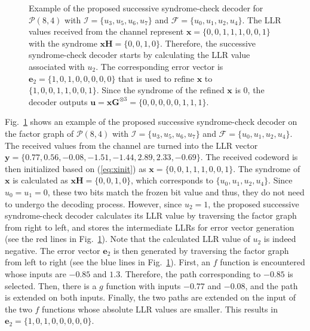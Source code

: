 \documentclass[conference]{IEEEtran}
\begin{document}
\begin{figure}
    \centering
    
    \caption{Example of the proposed successive syndrome-check decoder for $\mathcal{P}(8,4)$ with $\mathcal{I} = \{u_3,u_5,u_6,u_7\}$ and $\mathcal{F} = \{u_0,u_1,u_2,u_4\}$. The LLR values received from the channel represent $\bm{x} = \{0,0,1,1,1,0,0,1\}$ with the syndrome $\bm{x}\bm{H} = \{0,0,1,0\}$. Therefore, the successive syndrome-check decoder starts by calculating the LLR value associated with $u_2$. The corresponding error vector is $\bm{e}_2 = \{1,0,1,0,0,0,0,0\}$ that is used to refine $\bm{x}$ to $\{1,0,0,1,1,0,0,1\}$. Since the syndrome of the refined $\bm{x}$ is $0$, the decoder outputs $\bm{u} = \bm{x}\bm{G}^{\otimes 3} = \{0,0,0,0,0,1,1,1\}$.}
    \label{fig:SSCdecEx}
\end{figure}

Fig.~\ref{fig:SSCdecEx} shows an example of the proposed successive syndrome-check decoder on the factor graph of $\mathcal{P}(8,4)$ with $\mathcal{I} = \{u_3,u_5,u_6,u_7\}$ and $\mathcal{F} = \{u_0,u_1,u_2,u_4\}$. The received values from the channel are turned into the LLR vector $\bm{y} = \{0.77,0.56,-0.08,-1.51,-1.44,2.89,2.33,-0.69\}$. The received codeword is then initialized based on (\ref{eq:xinit}) as $\bm{x} = \{0,0,1,1,1,0,0,1\}$. The syndrome of $\bm{x}$ is calculated as $\bm{x}\bm{H} = \{0,0,1,0\}$, which corresponds to $\{u_0,u_1,u_2,u_4\}$. Since $u_0 = u_1 = 0$, these two bits match the frozen bit value and thus, they do not need to undergo the decoding process. However, since $u_2 = 1$, the proposed successive syndrome-check decoder calculates its LLR value by traversing the factor graph from right to left, and stores the intermediate LLRs for error vector generation (see the red lines in Fig.~\ref{fig:SSCdecEx}). Note that the calculated LLR value of $u_2$ is indeed negative. The error vector $\bm{e}_2$ is then generated by traversing the factor graph from left to right (see the blue lines in Fig.~\ref{fig:SSCdecEx}). First, an $f$ function is encountered whose inputs are $-0.85$ and $1.3$. Therefore, the path corresponding to $-0.85$ is selected. Then, there is a $g$ function with inputs $-0.77$ and $-0.08$, and the path is extended on both inputs. Finally, the two paths are extended on the input of the two $f$ functions whose absolute LLR values are smaller. This results in $\bm{e}_2 = \{1,0,1,0,0,0,0,0\}$.
\end{document}
